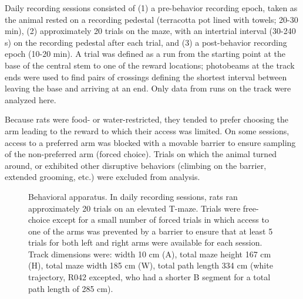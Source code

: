 \documentclass[11pt]{article}
\begin{document}
Daily recording sessions consisted of (1) a pre-behavior recording
epoch, taken as the animal rested on a recording pedestal (terracotta
pot lined with towels; 20-30 min), (2) approximately 20 trials on the
maze, with an intertrial interval (30-240 s) on the recording pedestal
after each trial, and (3) a post-behavior recording epoch (10-20
min). A trial was defined as a run from the starting point at the base
of the central stem to one of the reward locations; photobeams at the
track ends were used to find pairs of crossings defining the shortest
interval between leaving the base and arriving at an end. Only data
from runs on the track {\color{black} were} analyzed here.

Because rats were food- or water-restricted, they tended to prefer
choosing the arm leading to the {\color{black} reward} to which their access was
limited. On some sessions, access to a preferred arm was blocked with
a movable barrier to ensure sampling of the non-preferred arm (forced
choice). Trials on which the animal turned around, or exhibited other
disruptive behaviors (climbing on the barrier, extended grooming,
etc.) were excluded from analysis.

\begin{figure}[h]
  \centering
  \caption{Behavioral apparatus. In daily recording sessions, rats ran
    approximately 20 trials on an elevated T-maze. Trials were
    free-choice except for a small number of forced trials in which
    access to one of the arms was prevented by a barrier to ensure
    that at least 5 trials for both left and right arms were available
    for each session. Track dimensions were: width 10 cm (A), total
    maze height 167 cm (H), total maze width 185 cm (W), total path
    length 334 cm (white trajectory, R042 excepted, who had a shorter B
    segment for a total path length of 285 cm).}
  \label{fig:behavior}
\end{figure}
\end{document}
